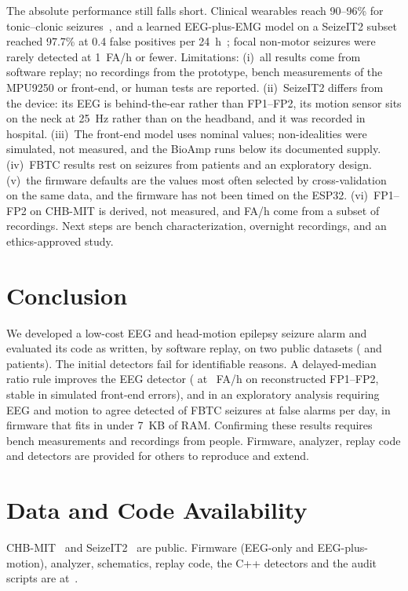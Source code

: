 \documentclass[conference,letterpaper]{IEEEtran}
\begin{document}
The absolute performance still falls short. Clinical wearables reach 90--96\% for tonic--clonic seizures~\cite{beniczky2021guideline}, and a learned EEG-plus-EMG model on a SeizeIT2 subset reached 97.7\% at 0.4 false positives per 24~h~\cite{zhang2024multimodal}; focal non-motor seizures were rarely detected at 1~FA/h or fewer. Limitations: (i)~all results come from software replay; no recordings from the prototype, bench measurements of the MPU9250 or front-end, or human tests are reported. (ii)~SeizeIT2 differs from the device: its EEG is behind-the-ear rather than FP1--FP2, its motion sensor sits on the neck at 25~Hz rather than on the headband, and it was recorded in hospital. (iii)~The front-end model uses nominal values; non-idealities were simulated, not measured, and the BioAmp runs below its documented supply. (iv)~FBTC results rest on \AvCoAN{} seizures from \AvSubj{} patients and an exploratory design. (v)~the firmware defaults are the values most often selected by cross-validation on the same data, and the firmware has not been timed on the ESP32. (vi)~FP1--FP2 on CHB-MIT is derived, not measured, and FA/h come from a subset of recordings. Next steps are bench characterization, overnight recordings, and an ethics-approved study.

\section{Conclusion}
We developed a low-cost EEG and head-motion epilepsy seizure alarm and evaluated its code as written, by software replay, on two public datasets (\NSubj{} and \SNSubj{} patients). The initial detectors fail for identifiable reasons. A delayed-median ratio rule improves the EEG detector (\DevASens{} at \DevAFAh{}~FA/h on reconstructed FP1--FP2, stable in simulated front-end errors), and in an exploratory analysis requiring EEG and motion to agree detected \AvCoASens{} of FBTC seizures at \AvCoAFAday{} false alarms per day, in firmware that fits in under 7~KB of RAM. Confirming these results requires bench measurements and recordings from people. Firmware, analyzer, replay code and detectors are provided for others to reproduce and extend.

\section*{Data and Code Availability}
CHB-MIT~\cite{goldberger2000physionet} and SeizeIT2~\cite{bhagubai2025seizeit2} are public. Firmware (EEG-only and EEG-plus-motion), analyzer, schematics, replay code, the C++ detectors and the audit scripts are at~\cite{vera_repo}.



\end{document}
